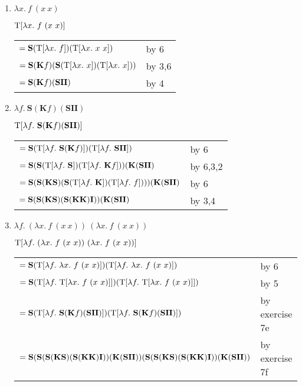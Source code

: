 \documentclass[11pt]{report}
\begin{document}
\begin{enumerate}
\begin{enumerate}
		\item $\lambda x. \ f \ (x \ x)$
			
			$\textnormal{T}[\lambda x. \ f \ (x \ x)]$
			
			\begin{tabular}{l l}
				$= \textbf{S}(\textnormal{T}[\lambda x. \ f])(\textnormal{T}[\lambda x. \ x \ x])$ & by 6 \\
				$= \textbf{S}(\textbf{K} f)(\textbf{S}(\textnormal{T}[\lambda x. \ x])(\textnormal{T}[\lambda x. \ x]))$ & by 3,6 \\
				$= \textbf{S}(\textbf{K} f)(\textbf{S}\textbf{I}\textbf{I})$ & by 4 \\
			\end{tabular}		
		
		\item $\lambda f. \ \textbf{S}(\textbf{K}f)(\textbf{SII})$
			
			$\nt[\lambda f. \ \textbf{S}(\textbf{K}f)(\textbf{SII})]$
			
			\begin{tabular}{l l}
				$= \cS(\nt[\lambda f. \ \cS(\cK f)])(\nt[\lambda f. \ \cS\cI\cI])$ & by 6 \\	
				$= \textbf{S}(\textbf{S}(\textnormal{T}[\lambda f. \ \textbf{S}])(\textnormal{T}[\lambda f. \ \textbf{K} f]))(\textbf{K}(\textbf{S}\textbf{I}\textbf{I})$ & by 6,3,2 \\
				$= \cS(\cS(\cK\cS)(\cS(\nt[\lambda f. \ \cK])(\nt[\lambda f. \ f])))(\cK(\cS\cI\cI)$ & by 6 \\
				$= \textbf{S}(\textbf{S}(\textbf{K}\textbf{S})(\textbf{S}(\textbf{K}\textbf{K})\textbf{I}))(\textbf{K}(\textbf{S}\textbf{I}\textbf{I})$ & by 3,4 \\					
			\end{tabular}
			
		\item $\lambda f. \ (\lambda x. \ f \ (x \ x)) \ (\lambda x. \ f \ (x \ x))$ 	
		
		$\nt[\lambda f. \ (\lambda x. \ f \ (x \ x)) \ (\lambda x. \ f \ (x \ x))]$
		
		\begin{tabular}{l l}
			$=\cS(\nt[\lambda f. \ \lambda x. \ f \ (x \ x)])(\nt[\lambda f. \ \lambda x. \ f \ (x \ x)])$ & by 6 \\
			$=\cS(\nt[\lambda f. \ \nt[\lambda x. \ f \ (x \ x)]])(\nt[\lambda f. \ \nt[\lambda x. \ f \ (x \ x)]])$ & by 5 \\
			$=\textbf{S}(\textnormal{T}[\lambda f. \ \textbf{S}(\textbf{K} f)(\textbf{S}\textbf{I}\textbf{I})])(\textnormal{T}[\lambda f. \ \textbf{S}(\textbf{K} f)(\textbf{S}\textbf{I}\textbf{I})])$ & by exercise 7e \\
			$=\textbf{S}(\textbf{S}(\textbf{S}(\textbf{K}\textbf{S})(\textbf{S}(\textbf{K}\textbf{K})\textbf{I}))(\textbf{K}(\textbf{S}\textbf{I}\textbf{I}))(\textbf{S}(\textbf{S}(\textbf{K}\textbf{S})(\textbf{S}(\textbf{K}\textbf{K})\textbf{I}))(\textbf{K}(\textbf{S}\textbf{I}\textbf{I}))$ & by exercise 7f\\
		\end{tabular}
		
	\end{enumerate}

	

	 
\end{enumerate}
	
\end{document}
